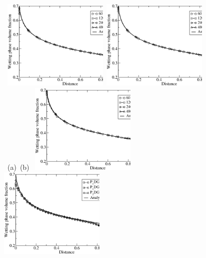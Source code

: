 \documentclass[times]{fldauth}
\begin{document}
\begin{figure}[h!]
  \begin{center}
    \vbox{\hbox{
        \hspace{0.0cm}\includegraphics[width=0.45\textwidth]{BL_P1DGP1.eps} 
        \hspace{0.0cm}\includegraphics[width=0.45\textwidth]{BL_P1DGP2.eps}}
      \hbox{
        \vspace{-0.cm}\hbox{\hspace{3.0cm}(a)} 
        \vspace{-0.cm}\hbox{\hspace{6.0cm}(b)}}
      \vspace{0.0cm}\hbox{
        \hspace{0.0cm}\includegraphics[width=0.45\textwidth]{BL_P2DGP1DG.eps}
        \hspace{0.0cm}\includegraphics[width=0.45\textwidth]{BL_3D.eps}}
}
\end{center}
\end{figure}
\end{document}
